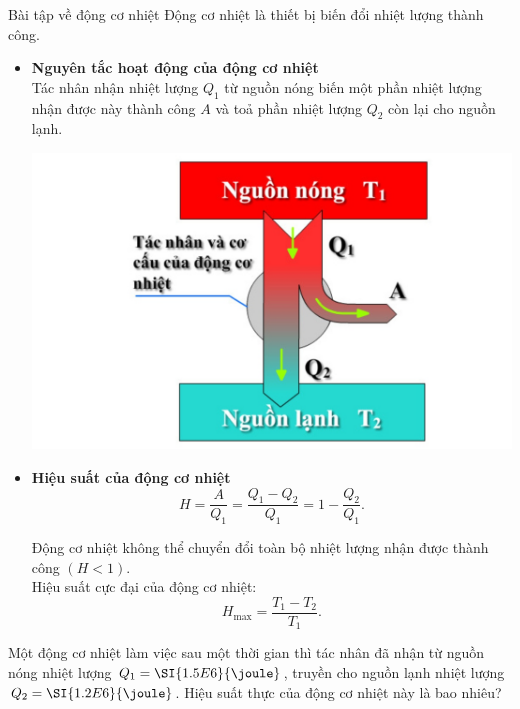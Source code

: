 	\begin{dang}{Bài tập về động cơ nhiệt}
Động cơ nhiệt là thiết bị biến đổi nhiệt lượng thành công.\\
			\begin{itemize}
				\item \textbf{Nguyên tắc hoạt động của động cơ nhiệt}\\
				Tác nhân nhận nhiệt lượng $Q_1$ từ nguồn nóng biến một phần nhiệt lượng nhận được này thành công $A$ và toả phần nhiệt lượng $Q_2$ còn lại cho nguồn lạnh.
				\begin{center}
					\includegraphics[scale=0.25]{figs/VN12-Y24-PH-SYL-007-1}
				\end{center}
				\item \textbf{Hiệu suất của động cơ nhiệt}\\
				$$H=\dfrac{A}{Q_1}=\dfrac{Q_1-Q_2}{Q_1}=1-\dfrac{Q_2}{Q_1}.$$
\begin{luuy}
	Động cơ nhiệt không thể chuyển đổi toàn bộ nhiệt lượng nhận được thành công $\left(H<1\right)$.\\
					Hiệu suất cực đại của động cơ nhiệt:
					$$H_\text{max}=\dfrac{T_1-T_2}{T_1}.$$
\end{luuy}
			\end{itemize}
\end{dang}
\begin{vd}
Một động cơ nhiệt làm việc sau một thời gian thì tác nhân đã nhận từ nguồn nóng nhiệt lượng $Q_1=\SI{1.5E6}{\joule}$, truyền cho nguồn lạnh nhiệt lượng $Q_2=\SI{1.2E6}{\joule}$. Hiệu suất thực của động cơ nhiệt này là bao nhiêu?
\end{vd}
